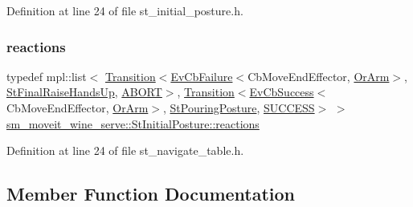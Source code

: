 Definition at line 24 of file st\+\_\+initial\+\_\+posture.\+h.

\mbox{\label{structsm__moveit__wine__serve_1_1StInitialPosture_a651fc981763b91ceb98724147f50d1ad}} 
\subsubsection{\texorpdfstring{reactions}{reactions}\hspace{0.1cm}{\footnotesize\ttfamily [2/2]}}
{\footnotesize\ttfamily typedef mpl\+::list$<$ \hyperlink{classsmacc_1_1Transition}{Transition}$<$\hyperlink{structsmacc_1_1EvCbFailure}{Ev\+Cb\+Failure}$<$Cb\+Move\+End\+Effector, \hyperlink{classsm__moveit__wine__serve_1_1OrArm}{Or\+Arm}$>$, \hyperlink{structsm__moveit__wine__serve_1_1StFinalRaiseHandsUp}{St\+Final\+Raise\+Hands\+Up}, \hyperlink{structsmacc_1_1default__transition__tags_1_1ABORT}{A\+B\+O\+RT}$>$, \hyperlink{classsmacc_1_1Transition}{Transition}$<$\hyperlink{structsmacc_1_1EvCbSuccess}{Ev\+Cb\+Success}$<$Cb\+Move\+End\+Effector, \hyperlink{classsm__moveit__wine__serve_1_1OrArm}{Or\+Arm}$>$, \hyperlink{structsm__moveit__wine__serve_1_1StPouringPosture}{St\+Pouring\+Posture}, \hyperlink{structsmacc_1_1default__transition__tags_1_1SUCCESS}{S\+U\+C\+C\+E\+SS}$>$ $>$ \hyperlink{structsm__moveit__wine__serve_1_1StInitialPosture_a2fa5fcc86ed1b9262a87a7438b85b559}{sm\+\_\+moveit\+\_\+wine\+\_\+serve\+::\+St\+Initial\+Posture\+::reactions}}



Definition at line 24 of file st\+\_\+navigate\+\_\+table.\+h.



\subsection{Member Function Documentation}
\mbox{\label{structsm__moveit__wine__serve_1_1StInitialPosture_a94e404c92f10702cd8ea8b1299c703d5}} 
